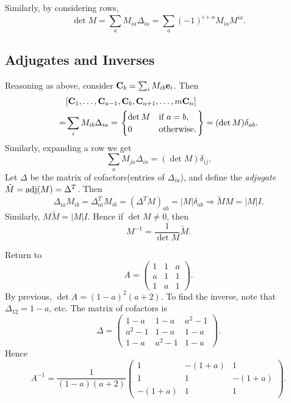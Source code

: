 \documentclass[10pt]{article}
\begin{document}
    Similarly, by considering rows, 
    \[
        \det M = \sum_{a}M_{ia}\Delta_{ia}=\sum_{a}(-1)^{i+a}M_{ia}M^{ia}
    .\]
    \subsection{Adjugates and Inverses}
    Reasoning as above, consider $ {\bf C}_b=\sum_i M_{ib}{\bf e}_i $. Then 
    \[
       \begin{aligned}
            &[{\bf C}_1,\dots,{\bf C}_{a-1},{\bf C}_b,{\bf C}_{a+1},\dots,m{\bf C}_n]\\
            =&\sum_{i}M_{ib}\Delta_{ia}=\left.\begin{cases}
            \det M &\text{if }a=b,\\
            0 &\text{otherwise.}\\
            \end{cases}\right\rbrace  = (\det M )\delta_{ab}.
       \end{aligned} 
    \]
    Similarly, expanding a row we get 
    \[
        \sum_{a}M_{ja}\Delta_{ia} = (\det M)\delta_{ij}
    .\]
    Let $ \Delta $ be the matrix of cofactors(entries of $\Delta_{ia}$), and define the \textit{adjugate} $ \tilde{M}=\operatorname{adj}(M) = \Delta^T $. Then 
    \[
        \Delta_{ia}M_{ib}=\Delta^T_{ai}M_{ib}=(\Delta^T M)_{ab}=|M| \delta_{ab} \Longrightarrow \tilde{M}M=|M|I
    .\] 
    Similarly, $ M \tilde{M}=|M|I $. Hence if $ \det M\neq 0 $, then 
    \[
        M^{-1}=\frac{1}{\det M}\tilde{M}
    .\]
    \begin{example}
        Return to 
        \[
            A=\begin{pmatrix}
                1&1&a\\
                a&1&1\\
                1&a&1
            \end{pmatrix}
        .\]
        By previous, $ \det A=(1-a)^2(a+2) $. To find the inverse, note that $ \Delta_{12}=1-a $, etc. The matrix of cofactors is 
        \[
            \Delta=\begin{pmatrix}
                1-a&1-a&a^2-1\\
                a^2-1&1-a&1-a\\
                1-a&a^2-1&1-a
            \end{pmatrix}
        .\]
        Hence 
        \[
            A^{-1}=\frac{1}{(1-a)(a+2)}\begin{pmatrix}
                    1&-(1+a) & 1 \\
                    1 & 1&-(1+a) \\
                    -(1+a)& 1 & 1
            \end{pmatrix}
        .\]
    \end{example}
\end{document}
